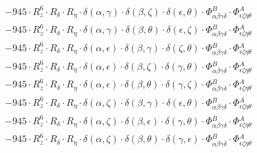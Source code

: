 \documentclass{article}
\begin{document}
\begin{equation}
\begin{array}{c}
 \\[0.2em] 		 - 945 \cdot R_{z}^{6} \cdot R_{\delta{}} \cdot R_{\eta{}} \cdot \delta{}\left(\alpha{}, \gamma{}\right) \cdot \delta{}\left(\beta{}, \zeta{}\right) \cdot \delta{}\left(\epsilon{}, \theta{}\right) \cdot \Phi{}^{B}_{\alpha{}\beta{}\gamma{}\delta{}} \cdot \Phi{}^{A}_{\epsilon{}\zeta{}\eta{}\theta{}} 
 \\[0.2em] 		 - 945 \cdot R_{z}^{6} \cdot R_{\delta{}} \cdot R_{\eta{}} \cdot \delta{}\left(\alpha{}, \gamma{}\right) \cdot \delta{}\left(\beta{}, \theta{}\right) \cdot \delta{}\left(\epsilon{}, \zeta{}\right) \cdot \Phi{}^{B}_{\alpha{}\beta{}\gamma{}\delta{}} \cdot \Phi{}^{A}_{\epsilon{}\zeta{}\eta{}\theta{}} 
 \\[0.2em] 		 - 945 \cdot R_{z}^{6} \cdot R_{\delta{}} \cdot R_{\eta{}} \cdot \delta{}\left(\alpha{}, \epsilon{}\right) \cdot \delta{}\left(\beta{}, \gamma{}\right) \cdot \delta{}\left(\zeta{}, \theta{}\right) \cdot \Phi{}^{B}_{\alpha{}\beta{}\gamma{}\delta{}} \cdot \Phi{}^{A}_{\epsilon{}\zeta{}\eta{}\theta{}} 
 \\[0.2em] 		 - 945 \cdot R_{z}^{6} \cdot R_{\delta{}} \cdot R_{\eta{}} \cdot \delta{}\left(\alpha{}, \epsilon{}\right) \cdot \delta{}\left(\beta{}, \zeta{}\right) \cdot \delta{}\left(\gamma{}, \theta{}\right) \cdot \Phi{}^{B}_{\alpha{}\beta{}\gamma{}\delta{}} \cdot \Phi{}^{A}_{\epsilon{}\zeta{}\eta{}\theta{}} 
 \\[0.2em] 		 - 945 \cdot R_{z}^{6} \cdot R_{\delta{}} \cdot R_{\eta{}} \cdot \delta{}\left(\alpha{}, \epsilon{}\right) \cdot \delta{}\left(\beta{}, \theta{}\right) \cdot \delta{}\left(\gamma{}, \zeta{}\right) \cdot \Phi{}^{B}_{\alpha{}\beta{}\gamma{}\delta{}} \cdot \Phi{}^{A}_{\epsilon{}\zeta{}\eta{}\theta{}} 
 \\[0.2em] 		 - 945 \cdot R_{z}^{6} \cdot R_{\delta{}} \cdot R_{\eta{}} \cdot \delta{}\left(\alpha{}, \zeta{}\right) \cdot \delta{}\left(\beta{}, \gamma{}\right) \cdot \delta{}\left(\epsilon{}, \theta{}\right) \cdot \Phi{}^{B}_{\alpha{}\beta{}\gamma{}\delta{}} \cdot \Phi{}^{A}_{\epsilon{}\zeta{}\eta{}\theta{}} 
 \\[0.2em] 		 - 945 \cdot R_{z}^{6} \cdot R_{\delta{}} \cdot R_{\eta{}} \cdot \delta{}\left(\alpha{}, \zeta{}\right) \cdot \delta{}\left(\beta{}, \epsilon{}\right) \cdot \delta{}\left(\gamma{}, \theta{}\right) \cdot \Phi{}^{B}_{\alpha{}\beta{}\gamma{}\delta{}} \cdot \Phi{}^{A}_{\epsilon{}\zeta{}\eta{}\theta{}} 
 \\[0.2em] 		 - 945 \cdot R_{z}^{6} \cdot R_{\delta{}} \cdot R_{\eta{}} \cdot \delta{}\left(\alpha{}, \zeta{}\right) \cdot \delta{}\left(\beta{}, \theta{}\right) \cdot \delta{}\left(\gamma{}, \epsilon{}\right) \cdot \Phi{}^{B}_{\alpha{}\beta{}\gamma{}\delta{}} \cdot \Phi{}^{A}_{\epsilon{}\zeta{}\eta{}\theta{}} 

\end{array}
\end{equation}
\end{document}
